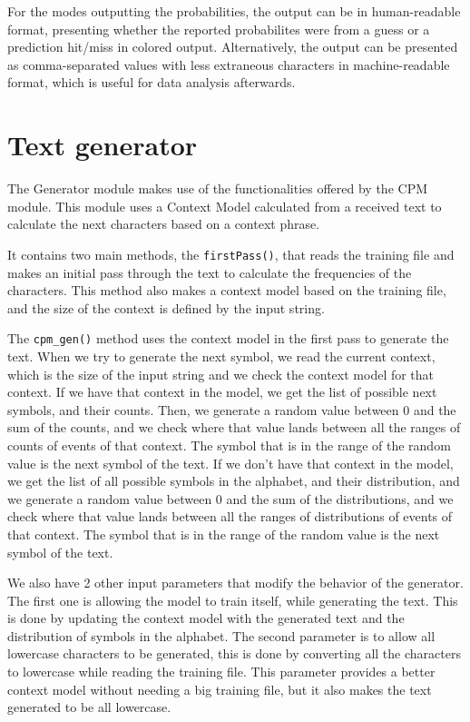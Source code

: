 \documentclass{article}
\begin{document}
For the modes outputting the probabilities, the output can be in human-readable format, presenting whether the reported probabilites were from a guess or a prediction hit/miss in colored output.
Alternatively, the output can be presented as comma-separated values with less extraneous characters in machine-readable format, which is useful for data analysis afterwards.


\section{Text generator}
\label{sec:text-generator}

The Generator module makes use of the functionalities offered by the CPM module.
This module uses a Context Model calculated from a received text to calculate the
next characters based on a context phrase. 

It contains two main methods, the \verb|firstPass()|, that reads the training file and makes an initial pass through the text to calculate the frequencies of the characters.
This method also makes a context model based on the training file, and the size of the context is defined by the input string. 

The \verb|cpm_gen()| method uses the context model in the first pass to generate the text.
When we try to generate the next symbol, we read the current context, which is the size of the input string and we check the context model for that context. If we have that context in the model, we get the list of possible next symbols, and their counts. Then, we generate a random value between 0 and the sum of the counts, and we check where that value lands between all the ranges of counts of events of that context. The symbol that is in the range of the random value is the next symbol of the text.
If we don't have that context in the model, we get the list of all possible symbols in the alphabet, and their distribution, and we generate a random value between 0 and the sum of the distributions, and we check where that value lands between all the ranges of distributions of events of that context. The symbol that is in the range of the random value is the next symbol of the text. 

We also have 2 other input parameters that modify the behavior of the generator. The first one is allowing the model to train itself, while generating the text. This is done by updating the context model with the generated text and the distribution of symbols in the alphabet.
The second parameter is to allow all lowercase characters to be generated, this is done by converting all the characters to lowercase while reading the training file. This parameter provides a better context model without needing a big training file, but it also makes the text generated to be all lowercase.
\end{document}
